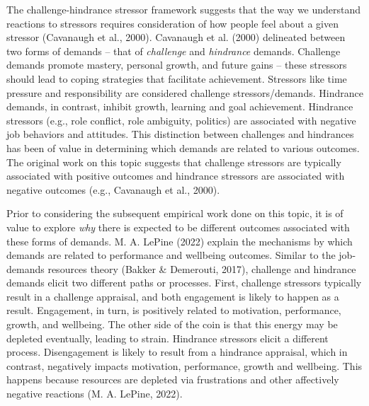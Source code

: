 \documentclass[
  english,
  man]{apa6}
\begin{document}
The challenge-hindrance stressor framework suggests that the way we understand reactions to stressors requires consideration of how people feel about a given stressor (Cavanaugh et al., 2000). Cavanaugh et al. (2000) delineated between two forms of demands -- that of \emph{challenge} and \emph{hindrance} demands. Challenge demands promote mastery, personal growth, and future gains -- these stressors should lead to coping strategies that facilitate achievement. Stressors like time pressure and responsibility are considered challenge stressors/demands. Hindrance demands, in contrast, inhibit growth, learning and goal achievement. Hindrance stressors (e.g., role conflict, role ambiguity, politics) are associated with negative job behaviors and attitudes. This distinction between challenges and hindrances has been of value in determining which demands are related to various outcomes. The original work on this topic suggests that challenge stressors are typically associated with positive outcomes and hindrance stressors are associated with negative outcomes (e.g., Cavanaugh et al., 2000).

Prior to considering the subsequent empirical work done on this topic, it is of value to explore \emph{why} there is expected to be different outcomes associated with these forms of demands. M. A. LePine (2022) explain the mechanisms by which demands are related to performance and wellbeing outcomes. Similar to the job-demands resources theory (Bakker \& Demerouti, 2017), challenge and hindrance demands elicit two different paths or processes. First, challenge stressors typically result in a challenge appraisal, and both engagement is likely to happen as a result. Engagement, in turn, is positively related to motivation, performance, growth, and wellbeing. The other side of the coin is that this energy may be depleted eventually, leading to strain. Hindrance stressors elicit a different process. Disengagement is likely to result from a hindrance appraisal, which in contrast, negatively impacts motivation, performance, growth and wellbeing. This happens because resources are depleted via frustrations and other affectively negative reactions (M. A. LePine, 2022).
\end{document}
